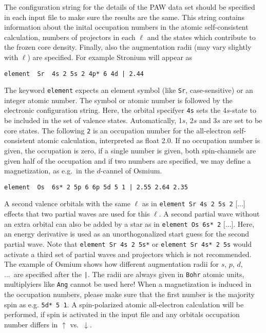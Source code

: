 \documentclass[12pt,BCOR8mm,noappendixprefix,nochapterprefix,bibtotoc,idxtotoc,openbib,tablecaptionabove]{scrbook}
\newcommand{\ttt}[1]{\texttt{#1}}
\begin{document}
The configuration string for the details of the PAW data set should be 
specified in each input file to make sure the results are the same.
This string contains information about the inital occupation numbers 
in the atomic self-consistent calculation, numbers of projectors in each $\ell$
and the states which contribute to the frozen core density. 
Finally, also the augmentation radii (may vary slightly with $\ell$) are specified.
For example Stronium will appear as
\begin{verbatim}
element  Sr  4s 2 5s 2 4p* 6 4d | 2.44
\end{verbatim}
The keyword \ttt{element} expects an element symbol (like \ttt{Sr}, case-sensitive) 
or an integer atomic number. The symbol or atomic number is followed by the electronic 
configuration string. Here, the orbital specifyer \ttt{4s} sets the 4$s$-state to be 
included in the set of valence states. Automatically, 1$s$, 2$s$ and 3$s$ are set to 
be core states. The following \ttt{2} is an occupation number for the all-electron 
self-consistent atomic calculation, interpreted as float 2.0.
If no occupation number is given, the occupation is zero, if a single number is given, 
both spin-channels are given half of the occupation and if two numbers are specified, 
we may define a magnetization, as e.g.~in the $d$-cannel of Osmium.
\begin{verbatim}
element  Os  6s* 2 5p 6 6p 5d 5 1 | 2.55 2.64 2.35
\end{verbatim}
A second valence orbitals with the same $\ell$ as in \ttt{element  Sr  4s 2 5s 2} [...] 
effects that two partial waves are used for this $\ell$.
A second partial wave without an extra orbital can also be added by 
a star as in \ttt{element  Os  6s* 2} [...].
Here, an energy derivative is used as an unorthogonalized start guess for the second partial wave.
Note that \ttt{element  Sr  4s 2 5s*} or \ttt{element  Sr  4s* 2 5s} would activate a 
third set of partial waves and projectors which is not recommended.
The example of Osmium shows how different augmentation radii for $s$, $p$, $d$, ...~are specified after the \ttt{|}.
The radii are always given in \ttt{Bohr} atomic units, multiplyiers like \ttt{Ang} cannot be used here!
When a magnetization is induced in the occupation numbers, 
please make sure that the first number is the majority spin as e.g. \ttt{5d* 5 1}.
A spin-polarized atomic all-electron calculation will be performed, 
if spin is activated in the input file and any orbitals occupation 
number differs in $\uparrow$ vs.~$\downarrow$.
\end{document}
